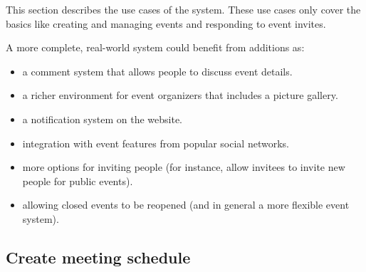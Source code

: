 \label{sec:usecases}
This section describes the use cases of the system. These use cases only cover the basics like creating and managing events and responding to event invites.

A more complete, real-world system could benefit from additions as:
\begin{itemize}
	\item a comment system that allows people to discuss event details.
	\item a richer environment for event organizers that includes a picture gallery.
	\item a notification system on the website.
	\item integration with event features from popular social networks.
	\item more options for inviting people (for instance, allow invitees to invite new people for public events).
	\item allowing closed events to be reopened (and in general a more flexible event system).
\end{itemize}

\subsection{Create meeting schedule}

